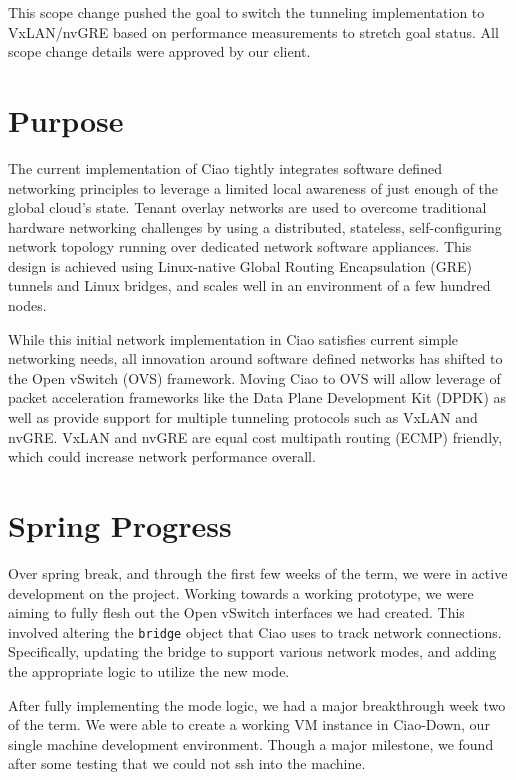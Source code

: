 \documentclass[10pt,onecolumn,journal,draftclsnofoot]{IEEEtran}
\begin{document}
This scope change pushed the goal to switch the tunneling implementation to
VxLAN/nvGRE based on performance measurements to stretch goal status. All scope
change details were approved by our client.

\section{Purpose}

The current implementation of Ciao tightly integrates software defined
networking principles to leverage a limited local awareness of just enough of
the global cloud's state. Tenant overlay networks are used to overcome
traditional hardware networking challenges by using a distributed, stateless,
self-configuring network topology running over dedicated network software
appliances. This design is achieved using Linux-native Global Routing
Encapsulation (GRE) tunnels and Linux bridges, and scales well in an environment
of a few hundred nodes.

While this initial network implementation in Ciao satisfies current simple
networking needs, all innovation around software defined networks has
shifted to the Open vSwitch (OVS) framework. Moving Ciao to OVS will allow
leverage of packet acceleration frameworks like the Data Plane Development Kit
(DPDK) as well as provide support for multiple tunneling protocols such as VxLAN
and nvGRE. VxLAN and nvGRE are equal cost multipath routing (ECMP) friendly,
which could increase network performance overall.

\section{Spring Progress}
Over spring break, and through the first few weeks of the term, we were in active
development on the project. Working towards a working prototype, we were aiming
to fully flesh out the Open vSwitch interfaces we had created. This involved
altering the \texttt{bridge} object that Ciao uses to track network connections.
Specifically, updating the bridge to support various network modes, and adding
the appropriate logic to utilize the new mode.

After fully implementing the mode logic, we had a major breakthrough week two
of the term. We were able to create a working VM instance in Ciao-Down,
our single machine development environment. Though a major milestone, we found
after some testing that we could not ssh into the machine.

\end{document}
